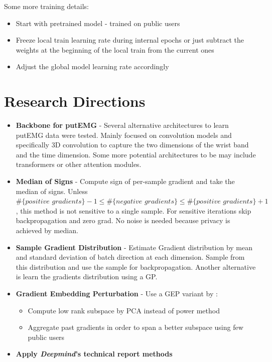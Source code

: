 \documentclass[fourier]{_style/dissertation}
\begin{document}
Some more training details:
\begin{itemize}
    \item Start with pretrained model - trained on public users
    \item Freeze local train learning rate during internal epochs or just subtract the weights at the beginning of the local train from the current ones
    \item Adjust the global model learning rate accordingly
\end{itemize}


\section{Research Directions}
\begin{itemize}

    \item \textbf{Backbone for putEMG} - Several alternative architectures to learn putEMG data were tested. Mainly focused on convolution models and specifically 3D convolution to capture the two dimensions of the wrist band and the time dimension. Some more potential architectures to be may include transformers or other attention modules.

    \item \textbf{Median of Signs} -  Compute sign of per-sample gradient and take the median of signs. Unless \\ $\#\{ \textit{positive gradients}\} - 1 \leq \#\{\textit{negative gradients}\} \leq \#\{\textit{positive gradients}\} + 1 $, this method is not sensitive to a single sample. For sensitive iterations skip backpropagation and zero grad. No noise is needed because privacy is achieved by median.

    \item \textbf{Sample Gradient Distribution} - Estimate Gradient distribution by mean and standard deviation of batch direction at each dimension. Sample from this distribution and use the sample for backpropagation. Another alternative is learn the gradients distribution using a GP.

    \item \textbf{Gradient Embedding Perturbation} - Use a GEP variant
    by :
    \begin{itemize}
        \item Compute low rank subspace by PCA instead of power method
        \item Aggregate past gradients in order to span a better subspace using few public users
    \end{itemize}

    \item \textbf{Apply \textit{Deepmind}'s technical report \cite{DeUnlockingScale} methods}
        
\end{itemize}
\end{document}

